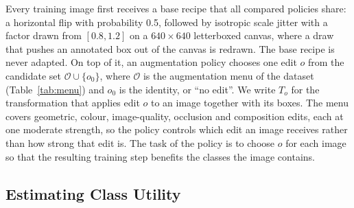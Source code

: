 \documentclass[conference]{IEEEtran}
\begin{document}
Every training image first receives a base recipe that all compared policies share: a horizontal flip with probability 0.5, followed by isotropic scale jitter with a factor drawn from $[0.8,1.2]$ on a $640\times640$ letterboxed canvas, where a draw that pushes an annotated box out of the canvas is redrawn. The base recipe is never adapted. On top of it, an augmentation policy chooses one edit $o$ from the candidate set $\mathcal{O}\cup\{o_0\}$, where $\mathcal{O}$ is the augmentation menu of the dataset (Table~\ref{tab:menu}) and $o_0$ is the identity, or ``no edit''. We write $T_o$ for the transformation that applies edit $o$ to an image together with its boxes. The menu covers geometric, colour, image-quality, occlusion and composition edits, each at one moderate strength, so the policy controls which edit an image receives rather than how strong that edit is. The task of the policy is to choose $o$ for each image so that the resulting training step benefits the classes the image contains.

\subsection{Estimating Class Utility}
\label{sec:method_estimator}
\end{document}
